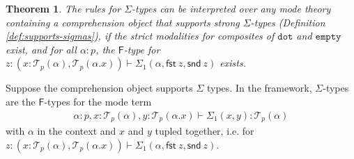 \documentclass[10pt]{article}
\newtheorem{theorem}{Theorem}
\theoremstyle{definition}
\newcommand\dsd[1]{\ensuremath{\mathsf{#1}}}
\newcommand{\yields}{\vdash}
\newcommand{\app}[2]{\ensuremath{#1 \: #2}}
\newcommand{\sigmacl}[3]{\ensuremath{(#1{:}#2,#3)}}
\newcommand{\fst}[1]{\app{\dsd{fst}}{#1}}
\newcommand{\snd}[1]{\app{\dsd{snd}}{#1}}
\newcommand\El[2]{\mathcal{T}_{#1}(#2)}
\newcommand{\tdot}{\ensuremath{\mathtt{dot}}}
\newcommand{\tempty}{\ensuremath{\mathtt{empty}}}
\begin{document}
\begin{theorem}
The rules for $\Sigma$-types can be interpreted over any mode theory
containing a comprehension object that supports strong $\Sigma$-types
(Definition \ref{def:supports-sigmas}),
if
the strict modalities for composites of $\tdot$ and $\tempty$ exist, and
for all $\alpha : p$,
the $\mathsf{F}$-type for $z : \sigmacl{x}{\El p \alpha}{\El p
  {\alpha.x}} \vdash \Sigma_1(\alpha,\fst z, \snd z)$ exists.
\end{theorem}

Suppose the comprehension object supports $\Sigma$ types. In the framework, $\Sigma$-types are the $\mathsf{F}$-types for the mode term
\begin{align*}
\alpha : p, x : \El{p}{\alpha}, y : \El{p}{\alpha.x} \yields \Sigma_1(x,y) : \El{p}{\alpha}
\end{align*}
with $\alpha$ in the context and $x$ and $y$ tupled together, i.e. for
$z : \sigmacl{x}{\El p \alpha}{\El p
  {\alpha.x}} \vdash \Sigma_1(\alpha,\fst z, \snd z)$.  
\end{document}
